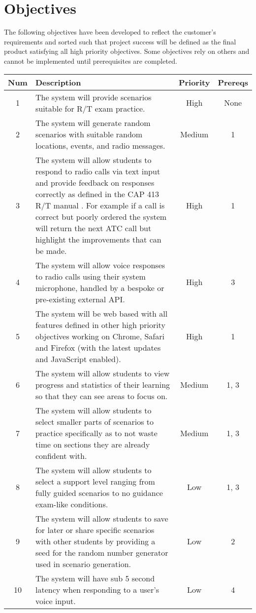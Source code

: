 \section{Objectives}
The following objectives have been developed to reflect the customer's requirements and sorted such that project success will be defined as the final product satisfying all high priority objectives. Some objectives rely on others and cannot be implemented until prerequisites are completed.

\begin{center}
    \begin{tabular}{ | c | m{20em} | c | c | }
        \hline
        \bf{Num} & \bf{Description} & \bf{Priority} & \bf{Prereqs} \\
        \hline
        1 & The system will provide scenarios suitable for R/T exam practice. & High & None \\
        \hline
        2 & The system will generate random scenarios with suitable random locations, events, and radio messages. & Medium & 1 \\
        \hline
        3 & The system will allow students to respond to radio calls via text input and provide feedback on responses correctly as defined in the CAP 413 R/T manual \cite{CAP413}. For example if a call is correct but poorly ordered the system will return the next ATC call but highlight the improvements that can be made. & High & 1 \\
        \hline
        4 & The system will allow voice responses to radio calls using their system microphone, handled by a bespoke or pre-existing external API. & High & 3 \\
        \hline
        5 & The system will be web based with all features defined in other high priority objectives working on Chrome, Safari and Firefox (with the latest updates and JavaScript enabled). & High & 1 \\
        \hline
        6 & The system will allow students to view progress and statistics of their learning so that they can see areas to focus on. & Medium & 1, 3 \\
        \hline
        7 & The system will allow students to select smaller parts of scenarios to practice specifically as to not waste time on sections they are already confident with. & Medium & 1, 3 \\
        \hline
        8 & The system will allow students to select a support level ranging from fully guided scenarios to no guidance exam-like conditions. & Low & 1, 3 \\
        \hline
        9 & The system will allow students to save for later or share specific scenarios with other students by providing a seed for the random number generator used in scenario generation. & Low & 2 \\
        \hline
        10 & The system will have sub 5 second latency when responding to a user's voice input. & Low & 4 \\
        \hline
    \end{tabular}
\end{center}